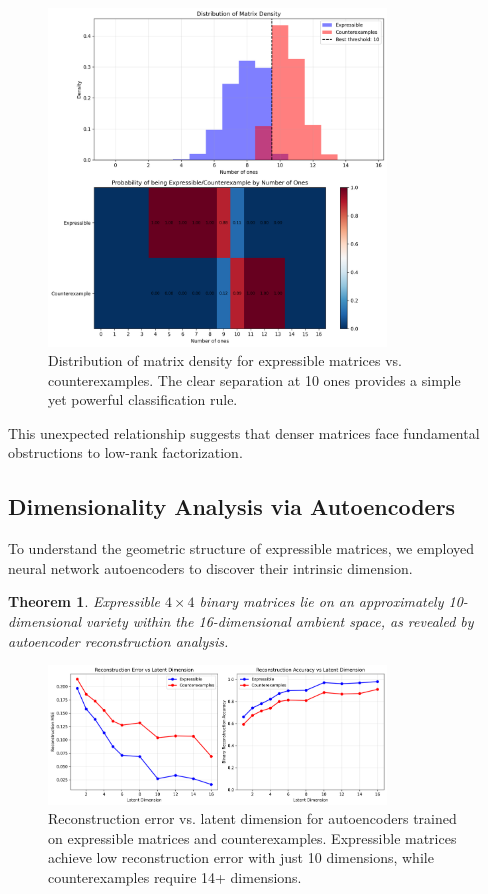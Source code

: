 \documentclass[11pt]{amsart}
\theoremstyle{plain}
\newtheorem{theorem}{Theorem}
\theoremstyle{definition}
\theoremstyle{remark}
\begin{document}
\begin{figure}[H]
\centering
\includegraphics[width=0.8\textwidth]{../ones_analysis_detailed.png}
\caption{Distribution of matrix density for expressible matrices vs. counterexamples. The clear separation at 10 ones provides a simple yet powerful classification rule.}
\end{figure}

This unexpected relationship suggests that denser matrices face fundamental obstructions to low-rank factorization.

\subsection{Dimensionality Analysis via Autoencoders}

To understand the geometric structure of expressible matrices, we employed neural network autoencoders to discover their intrinsic dimension.

\begin{theorem}
Expressible $4 \times 4$ binary matrices lie on an approximately 10-dimensional variety within the 16-dimensional ambient space, as revealed by autoencoder reconstruction analysis.
\end{theorem}

\begin{figure}[H]
\centering
\includegraphics[width=0.8\textwidth]{../autoencoder_dimension_analysis.png}
\caption{Reconstruction error vs. latent dimension for autoencoders trained on expressible matrices and counterexamples. Expressible matrices achieve low reconstruction error with just 10 dimensions, while counterexamples require 14+ dimensions.}
\end{figure}
\end{document}
